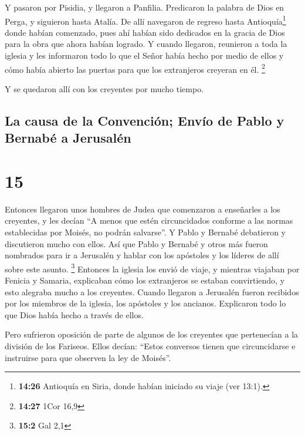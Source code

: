 Y pasaron por Pisidia, y llegaron a Panfilia.
 Predicaron la palabra de Dios en Perga, y siguieron
hasta Atalía.  De allí navegaron de regreso hasta
Antioquía\footnote{\textbf{14:26} Antioquía en Siria, donde habían
  iniciado su viaje (ver 13:1).} donde habían comenzado, pues ahí habían
sido dedicados en la gracia de Dios para la obra que ahora habían
logrado.  Y cuando llegaron, reunieron a toda la iglesia
y les informaron todo lo que el Señor había hecho por medio de ellos y
cómo había abierto las puertas para que los extranjeros creyeran en él.
\footnote{\textbf{14:27} 1Cor 16,9}

 Y se quedaron allí con los creyentes por mucho tiempo.

\hypertarget{la-causa-de-la-convenciuxf3n-envuxedo-de-pablo-y-bernabuxe9-a-jerusaluxe9n}{%
\subsection{La causa de la Convención; Envío de Pablo y Bernabé a
Jerusalén}\label{la-causa-de-la-convenciuxf3n-envuxedo-de-pablo-y-bernabuxe9-a-jerusaluxe9n}}

\hypertarget{section-14}{%
\section{15}\label{section-14}}

 Entonces llegaron unos hombres de Judea que comenzaron a
enseñarles a los creyentes, y les decían ``A menos que estén
circuncidados conforme a las normas establecidas por Moisés, no podrán
salvarse''.  Y Pablo y Bernabé debatieron y discutieron
mucho con ellos. Así que Pablo y Bernabé y otros más fueron nombrados
para ir a Jerusalén y hablar con los apóstoles y los líderes de allí
sobre este asunto. \footnote{\textbf{15:2} Gal 2,1} 
Entonces la iglesia los envió de viaje, y mientras viajaban por Fenicia
y Samaria, explicaban cómo los extranjeros se estaban convirtiendo, y
esto alegraba mucho a los creyentes.  Cuando llegaron a
Jerusalén fueron recibidos por los miembros de la iglesia, los apóstoles
y los ancianos. Explicaron todo lo que Dios había hecho a través de
ellos.

 Pero sufrieron oposición de parte de algunos de los
creyentes que pertenecían a la división de los Fariseos. Ellos decían:
``Estos conversos tienen que circuncidarse e instruirse para que
observen la ley de Moisés''.

